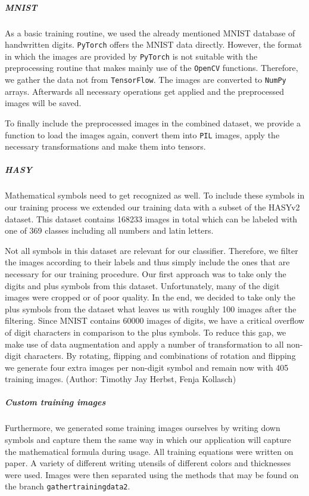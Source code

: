 \documentclass[12pt]{article}
\begin{document}
		\subparagraph{MNIST}
			As a basic training routine, we used the already mentioned MNIST database of handwritten digits. \texttt{PyTorch} offers the MNIST data directly. However, the format in which the images are provided by \texttt{PyTorch} is not suitable with the preprocessing routine that makes mainly use of the \texttt{OpenCV} functions. Therefore, we gather the data not from \texttt{TensorFlow}. The images are converted to \texttt{NumPy} arrays. Afterwards all necessary operations get applied and the preprocessed images will be saved. 
			
			To finally include the preprocessed images in the combined dataset, we provide a function to load the images again, convert them into \texttt{PIL} images, apply the necessary transformations and make them into tensors.
			
		\subparagraph{HASY}
			Mathematical symbols need to get recognized as well. To include these symbols in our training process we extended our training data with a subset of the HASYv2\cite{hasy} dataset. This dataset contains 168233 images in total which can be labeled with one of 369 classes including all numbers and latin letters. 
			
			Not all symbols in this dataset are relevant for our classifier. Therefore, we filter the images according to their labels and thus simply include the ones that are necessary for our training procedure. Our first approach was to take only the digits and plus symbols from this dataset. Unfortunately, many of the digit images were cropped or of poor quality. In the end, we decided to take only the plus symbols from the dataset what leaves us with roughly 100 images after the filtering. Since MNIST contains 60000 images of digits, we have a critical overflow of digit characters in comparison to the plus symbols. To reduce this gap, we make use of data augmentation and apply a number of transformation to all non-digit characters. By rotating, flipping and combinations of rotation and flipping we generate four extra images per non-digit symbol and remain now with 405 training images.
			\newline			\newline
			\indent\small{(Author: Timothy Jay Herbst, Fenja Kollasch)}
			\vspace{-0.5 cm}
		\subparagraph{Custom training images}	
		Furthermore, we generated some training images ourselves by writing down symbols and capture them the same way in which our application will capture the mathematical formula during usage.
		All training equations were written on paper.
		A variety of different writing utensils of different colors and thicknesses were used.
		Images were then separated using the methods that may be found on the branch \texttt{gathertrainingdata2}. %
		
\end{document}
